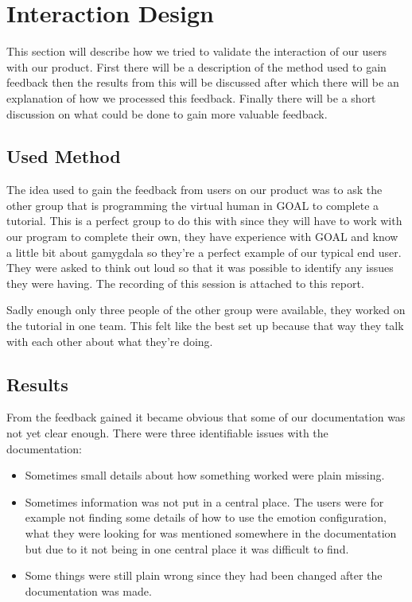 \documentclass[11pt]{article}
\begin{document}
\section{Interaction Design}
This section will describe how we tried to validate the interaction of our users with our product. First there will be a description of the method used to gain feedback then the results from this will be discussed after which there will be an explanation of how we processed this feedback. Finally there will be a short discussion on what could be done to gain more valuable feedback.

\subsection{Used Method}
The idea used to gain the feedback from users on our product was to ask  the other group that is programming the virtual human in GOAL to complete a tutorial. This is a perfect group to do this with since they will have to work with our program to complete their own, they have experience with GOAL and know a little bit about gamygdala so they're a perfect example of our typical end user. They were asked to think out loud so that it was possible to identify any issues they were having. The recording of this session is attached to this report.

Sadly enough only three people of the other group were available, they worked on the tutorial in one team. This felt like the best set up because that way they talk with each other about what they're doing.

\subsection{Results}
From the feedback gained it became obvious that some of our documentation was not yet clear enough. There were three identifiable issues with the documentation:

\begin{itemize}
	\item  Sometimes small details about how something worked were plain missing.
	\item Sometimes information was not put in a central place. The users were for example not finding some details of how to use the emotion configuration, what they were looking for was mentioned somewhere in the documentation but due to it not being in one central place it was difficult to find.
	
	\item Some things were still plain wrong since they had been changed after the documentation was made.
\end{itemize}
\end{document}

